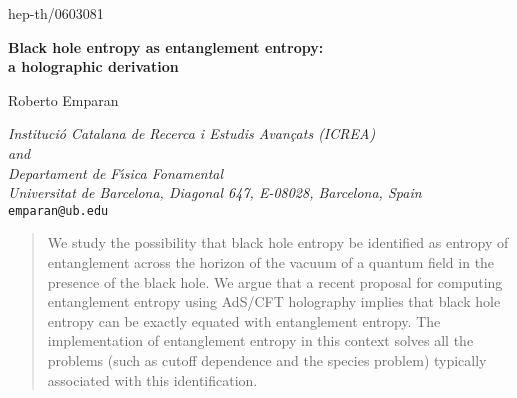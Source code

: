 \documentclass[12pt]{article}
\begin{document}
\thispagestyle{empty}

\hfill{}

\hfill{}

\hfill{}

\hfill{hep-th/0603081}

\vspace{32pt}

\begin{center}
\textbf{\Large Black hole entropy as entanglement entropy:}\\
\textbf{\Large a holographic derivation}\\

\vspace{40pt}

Roberto Emparan

\vspace{12pt}
\textit{Instituci\'o Catalana de Recerca i Estudis Avan\c cats (ICREA)}\\
\textit{and}\\
\textit{Departament de F{\'\i}sica Fonamental}\\
\textit{Universitat de
Barcelona, Diagonal 647, E-08028, Barcelona, Spain}\\\vspace{6pt}
\texttt{emparan@ub.edu}
\end{center}

\vspace{40pt}

\begin{abstract} 

We study the possibility that black hole entropy be identified as
entropy of entanglement across the horizon of the vacuum of a quantum
field in the presence of the black hole. We argue that a recent proposal
for computing entanglement entropy using AdS/CFT holography implies that
black hole entropy can be exactly equated with entanglement entropy. The
implementation of entanglement entropy in this context solves all the
problems (such as cutoff dependence and the species problem) typically
associated with this identification. 

\end{abstract}

\setcounter{footnote}{0}

\newpage
\end{document}
